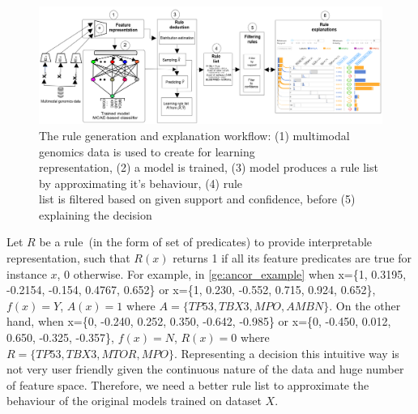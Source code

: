 
\begin{figure}
	\centering
		\includegraphics[scale=0.75]{images/rules_wf.png}
	    \caption[The rule generation and explanation workflow]{The rule generation and explanation workflow: (1) multimodal genomics data is used to create for learning\\ representation, (2) a model is trained, (3) model produces a rule list by approximating it's behaviour, (4) rule\\ list is filtered based on given support and confidence, before (5) explaining the decision} 
	    \label{fig:rules_wf}
\end{figure}

\hspace*{3.5mm} Let $R$ be a rule~(in the form of set of predicates) to provide interpretable representation, such that $R(x)$ returns 1 if all its feature predicates are true for instance $x$, 0 otherwise. For example, in \cref{ge:ancor_example} when x=\{1, 0.3195, -0.2154, -0.154, 0.4767, 0.652\} or x=\{1, 0.230, -0.552, 0.715, 0.924, 0.652\}, $f(x)=Y$, $A(x)=1$ where $A=\{TP53, TBX3, MPO, AMBN\}$. On the other hand, when x=\{0, -0.240, 0.252, 0.350, -0.642, -0.985\} or x=\{0, -0.450, 0.012, 0.650, -0.325, -0.357\}, $f(x)=N$, $R(x)=0$ where $R=\{TP53, TBX3, MTOR, MPO\}$. Representing a decision this intuitive way is not very user friendly given the continuous nature of the data and huge number of feature space. Therefore, we need a better rule list to approximate the behaviour of the original models trained on dataset $X$. 

